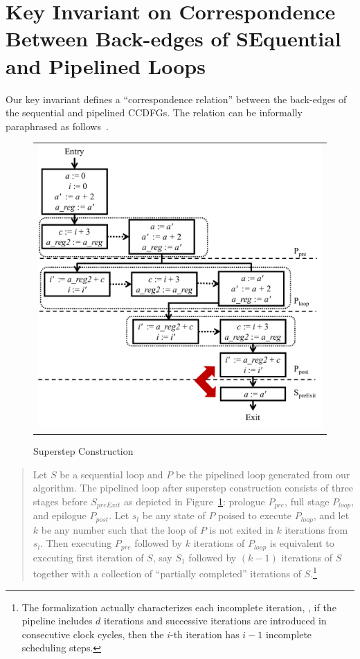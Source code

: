 

\section{Key Invariant on Correspondence Between Back-edges of SEquential and Pipelined Loops}
 Our key invariant defines a ``correspondence relation''
between the back-edges of the sequential and pipelined CCDFGs.
The relation can be informally paraphrased as
follows~\cite{disha-itp14}.

\begin{figure}[t!]
\begin{center}
\begin{tabular}{c}
\includegraphics[width=5.5in]{fig-proposal/algorithm-after-superstep-construction}
\end{tabular}
\end{center}
\caption{Superstep Construction}
\label{fig:algo3-3}
\end{figure}

\begin{quote}
Let $S$ be a sequential loop and $P$ be the pipelined loop
generated from our algorithm. The pipelined loop after superstep construction
consists of
three stages before $S_{preExit}$ as depicted in
Figure~\ref{fig:algo3-3}: prologue $P_{pre}$, full stage
$P_{loop}$, and epilogue $P_{post}$.  Let $s_l$ be any state of $P$
poised to execute $P_{loop}$, and let $k$ be any number such that
the loop of $P$ is not exited in $k$ iterations from $s_l$.
Then executing $P_{pre}$ followed by $k$ iterations of $P_{loop}$ is
equivalent to executing first iteration of $S$, say $S_1$
followed by $(k - 1)$ iterations of $S$ together with a
collection of ``partially completed'' iterations of
$S$.\footnote{The formalization actually characterizes each
  incomplete iteration, \eg, if the pipeline includes $d$
  iterations and successive iterations are introduced in
  consecutive clock cycles, then the $i$-th iteration has $i
  - 1$ incomplete scheduling steps.}
\end{quote}

